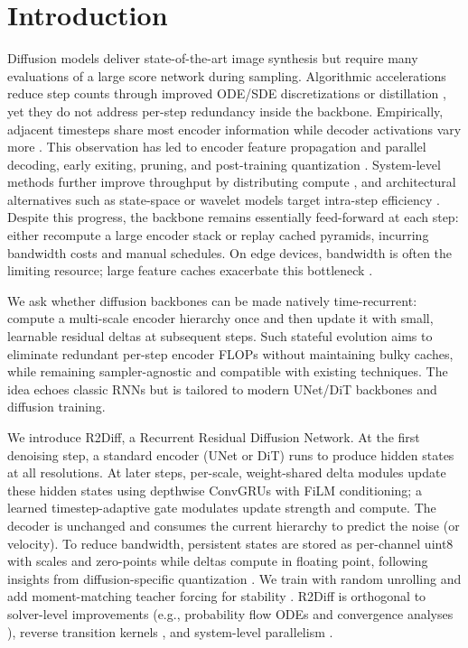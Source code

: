 \documentclass{article}
\begin{document}
\section{Introduction}
Diffusion models deliver state-of-the-art image synthesis but require many evaluations of a large score network during sampling. Algorithmic accelerations reduce step counts through improved ODE/SDE discretizations or distillation \cite{salimans-2024-multistep,chen-2023-the,chen-2022-sampling}, yet they do not address per-step redundancy inside the backbone. Empirically, adjacent timesteps share most encoder information while decoder activations vary more \cite{li-2023-faster}. This observation has led to encoder feature propagation and parallel decoding, early exiting, pruning, and post-training quantization \cite{li-2023-faster,moon-2024-simple,zhu-2024-dip,shang-2022-post}. System-level methods further improve throughput by distributing compute \cite{li-2024-distrifusion}, and architectural alternatives such as state-space or wavelet models target intra-step efficiency \cite{yan-2023-diffusion,phung-2022-wavelet}. Despite this progress, the backbone remains essentially feed-forward at each step: either recompute a large encoder stack or replay cached pyramids, incurring bandwidth costs and manual schedules. On edge devices, bandwidth is often the limiting resource; large feature caches exacerbate this bottleneck \cite{li-2023-snapfusion}.

We ask whether diffusion backbones can be made natively time-recurrent: compute a multi-scale encoder hierarchy once and then update it with small, learnable residual deltas at subsequent steps. Such stateful evolution aims to eliminate redundant per-step encoder FLOPs without maintaining bulky caches, while remaining sampler-agnostic and compatible with existing techniques. The idea echoes classic RNNs but is tailored to modern UNet/DiT backbones and diffusion training.

We introduce R2Diff, a Recurrent Residual Diffusion Network. At the first denoising step, a standard encoder (UNet or DiT) runs to produce hidden states at all resolutions. At later steps, per-scale, weight-shared delta modules update these hidden states using depthwise ConvGRUs with FiLM conditioning; a learned timestep-adaptive gate modulates update strength and compute. The decoder is unchanged and consumes the current hierarchy to predict the noise (or velocity). To reduce bandwidth, persistent states are stored as per-channel uint8 with scales and zero-points while deltas compute in floating point, following insights from diffusion-specific quantization \cite{shang-2022-post}. We train with random unrolling and add moment-matching teacher forcing for stability \cite{salimans-2024-multistep}. R2Diff is orthogonal to solver-level improvements (e.g., probability flow ODEs and convergence analyses \cite{chen-2023-the,chen-2022-improved,cheng-2017-convergence,benton-2023-nearlyd}), reverse transition kernels \cite{huang-2024-reverse}, and system-level parallelism \cite{li-2024-distrifusion}.
\end{document}

